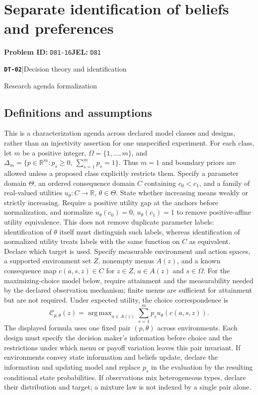 \documentclass[11pt,a4paper]{article}
\newcommand{\R}{\mathbb R}
\DeclareMathOperator*{\argmax}{arg\,max}
\newcommand{\entrymeta}[3]{{\sffamily\small\color{muted}\textbf{\texttt{#1}}\quad|\quad #2\par #3\par}}
\begin{document}
\section*{Separate identification of beliefs and preferences}
\textbf{Problem ID:} \texttt{D81-16}\quad \textbf{JEL:} \texttt{D81}\par
\label{problem:OP-0587}
\label{beyond:DT-02}
\entrymeta{DT-02}{Decision theory and identification}{Research agenda formalization}
\subsection*{Definitions and assumptions}
This is a characterization agenda across declared model classes and designs, rather than an injectivity assertion for one unspecified experiment. For each class, let $m$ be a positive integer, $\Omega=\{1,\ldots,m\}$, and $\Delta_m=\{p\in\R^m:p_s\geq0,\ \sum_{s=1}^m p_s=1\}$. Thus $m=1$ and boundary priors are allowed unless a proposed class explicitly restricts them. Specify a parameter domain $\Theta$, an ordered consequence domain $C$ containing $c_0<c_1$, and a family of real-valued utilities $u_\theta:C\to\R$, $\theta\in\Theta$. State whether increasing means weakly or strictly increasing. Require a positive utility gap at the anchors before normalization, and normalize $u_\theta(c_0)=0$, $u_\theta(c_1)=1$ to remove positive-affine utility equivalence. This does not remove duplicate parameter labels: identification of $\theta$ itself must distinguish such labels, whereas identification of normalized utility treats labels with the same function on $C$ as equivalent. Declare which target is used. Specify measurable environment and action spaces, a supported environment set $Z$, nonempty menus $A(z)$, and a known consequence map $c(a,s,z)\in C$ for $z\in Z$, $a\in A(z)$ and $s\in\Omega$. For the maximizing-choice model below, require attainment and the measurability needed by the declared observation mechanism; finite menus are sufficient for attainment but are not required. Under expected utility, the choice correspondence is
\[
 \mathcal C_{p,\theta}(z)=\argmax_{a\in A(z)}
 \sum_{s=1}^{m}p_su_\theta(c(a,s,z)).
\]
The displayed formula uses one fixed pair $(p,\theta)$ across environments. Each design must specify the decision maker's information before choice and the restrictions under which menu or payoff variation leaves this pair invariant. If environments convey state information and beliefs update, declare the information and updating model and replace $p_s$ in the evaluation by the resulting conditional state probabilities. If observations mix heterogeneous types, declare their distribution and target; a mixture law is not indexed by a single pair alone.
\end{document}

